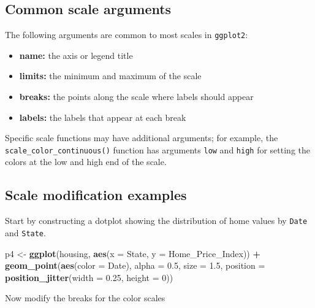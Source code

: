 \documentclass[]{book}
\newenvironment{Shaded}{\begin{snugshade}}{\end{snugshade}}
\newcommand{\KeywordTok}[1]{\textcolor[rgb]{0.13,0.29,0.53}{\textbf{#1}}}
\newcommand{\DataTypeTok}[1]{\textcolor[rgb]{0.13,0.29,0.53}{#1}}
\newcommand{\DecValTok}[1]{\textcolor[rgb]{0.00,0.00,0.81}{#1}}
\newcommand{\FloatTok}[1]{\textcolor[rgb]{0.00,0.00,0.81}{#1}}
\newcommand{\StringTok}[1]{\textcolor[rgb]{0.31,0.60,0.02}{#1}}
\newcommand{\OperatorTok}[1]{\textcolor[rgb]{0.81,0.36,0.00}{\textbf{#1}}}
\newcommand{\NormalTok}[1]{#1}
\providecommand{\tightlist}{%
  \setlength{\itemsep}{0pt}\setlength{\parskip}{0pt}}
\begin{document}
\subsection{Common scale arguments}\label{common-scale-arguments}

The following arguments are common to most scales in \texttt{ggplot2}:

\begin{itemize}
\tightlist
\item
  \textbf{name:} the axis or legend title
\item
  \textbf{limits:} the minimum and maximum of the scale
\item
  \textbf{breaks:} the points along the scale where labels should appear
\item
  \textbf{labels:} the labels that appear at each break
\end{itemize}

Specific scale functions may have additional arguments; for example, the
\texttt{scale\_color\_continuous()} function has arguments \texttt{low}
and \texttt{high} for setting the colors at the low and high end of the
scale.

\subsection{Scale modification
examples}\label{scale-modification-examples}

Start by constructing a dotplot showing the distribution of home values
by \texttt{Date} and \texttt{State}.

\begin{Shaded}
\begin{Highlighting}[]
\NormalTok{p4 <-}\StringTok{ }\KeywordTok{ggplot}\NormalTok{(housing, }\KeywordTok{aes}\NormalTok{(}\DataTypeTok{x =}\NormalTok{ State, }\DataTypeTok{y =}\NormalTok{ Home_Price_Index)) }\OperatorTok{+}\StringTok{ }
\StringTok{    }\KeywordTok{geom_point}\NormalTok{(}\KeywordTok{aes}\NormalTok{(}\DataTypeTok{color =}\NormalTok{ Date), }\DataTypeTok{alpha =} \FloatTok{0.5}\NormalTok{, }\DataTypeTok{size =} \FloatTok{1.5}\NormalTok{,}
               \DataTypeTok{position =} \KeywordTok{position_jitter}\NormalTok{(}\DataTypeTok{width =} \FloatTok{0.25}\NormalTok{, }\DataTypeTok{height =} \DecValTok{0}\NormalTok{))}
\end{Highlighting}
\end{Shaded}

Now modify the breaks for the color scales
\end{document}
